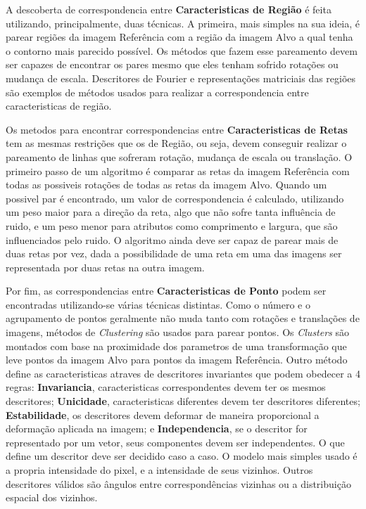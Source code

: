     A descoberta de correspondencia entre \textbf{Caracteristicas de Região} é feita utilizando, principalmente, duas 
técnicas. A primeira, mais simples na sua ideia, é parear regiões da imagem Referência com a região da imagem Alvo a qual
tenha o contorno mais parecido possível. Os métodos que fazem esse pareamento devem ser capazes de encontrar os pares mesmo
que eles tenham sofrido rotações ou mudança de escala. Descritores de Fourier e representações matriciais das regiões são
exemplos de métodos usados para realizar a correspondencia entre caracteristicas de região.

    Os metodos para encontrar correspondencias entre \textbf{Caracteristicas de Retas} tem as mesmas restrições que os
de Região, ou seja, devem conseguir realizar o pareamento de linhas que sofreram rotação, mudança de escala ou translação.
O primeiro passo de um algoritmo é comparar as retas da imagem Referência com todas as possiveis rotações de todas as retas
da imagem Alvo. Quando um possivel par é encontrado, um valor de correspondencia é calculado, utilizando um peso maior para
a direção da reta, algo que não sofre tanta influência de ruido, e um peso menor para atributos como comprimento e largura,
que são influenciados pelo ruido. O algoritmo ainda deve ser capaz de parear mais de duas retas por vez, dada a possibilidade
de uma reta em uma das imagens ser representada por duas retas na outra imagem.

    Por fim, as correspondencias entre \textbf{Caracteristicas de Ponto} podem ser encontradas utilizando-se várias técnicas
distintas. Como o número e o agrupamento de pontos geralmente não muda tanto com rotações e translações de imagens, métodos de 
\textit{Clustering} são usados para parear pontos. Os \textit{Clusters} são montados com base na proximidade dos parametros
de uma transformação que leve pontos da imagem Alvo para pontos da imagem Referência. Outro método define as caracteristicas
atraves de descritores invariantes que podem obedecer a 4 regras: \textbf{Invariancia}, caracteristicas correspondentes 
devem ter os mesmos descritores; \textbf{Unicidade}, caracteristicas diferentes devem ter descritores diferentes; 
\textbf{Estabilidade}, os descritores devem deformar de maneira proporcional a deformação aplicada na imagem; e 
\textbf{Independencia}, se o descritor for representado por um vetor, seus componentes devem ser independentes. 
O que define um descritor deve ser decidido caso a caso. O modelo mais simples usado é a propria intensidade do pixel, 
e a intensidade de seus vizinhos. Outros descritores válidos são ângulos entre correspondências vizinhas ou a distribuição
espacial dos vizinhos.

